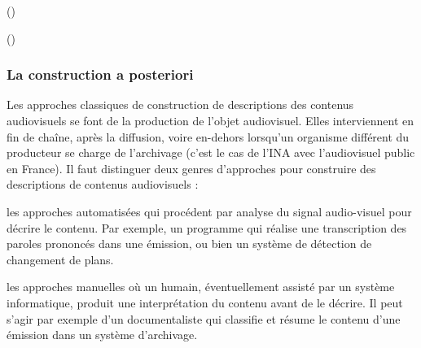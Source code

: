  (\cite[p.23, Metadata in the Workflow]{Austerberry2004})

 (\cite{Rayers2002})




\subsubsection{La construction a posteriori}
Les approches classiques de construction de descriptions des contenus audiovisuels se font  de la production de l'objet audiovisuel. 
Elles interviennent en fin de chaîne, après la diffusion, voire en-dehors lorsqu'un organisme différent du producteur se charge de l'archivage (c'est le cas de l'INA avec l'audiovisuel public en France). 
Il faut distinguer deux genres d'approches pour construire des descriptions de contenus audiovisuels : 
\begin{liste}
	\item les approches automatisées qui procédent par analyse du signal audio-visuel pour décrire le contenu.
	Par exemple, un programme qui réalise une transcription des paroles prononcés dans une émission, ou bien un système de détection de changement de plans. 

	\item les approches manuelles où un humain, éventuellement assisté par un système informatique, produit une interprétation du contenu avant de le décrire. 
	Il peut s'agir par exemple d'un documentaliste qui classifie et résume le contenu d'une émission dans un système d'archivage.
\end{liste}


